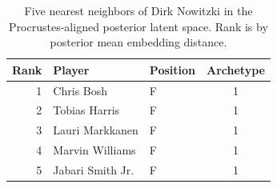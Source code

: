 \begin{table}[htbp]
  \centering\small
  \begin{tabular}{rllc}
    \toprule
    Rank & Player & Position & Archetype \\
    \midrule
    1 & Chris Bosh & F & 1 \\
    2 & Tobias Harris & F & 1 \\
    3 & Lauri Markkanen & F & 1 \\
    4 & Marvin Williams & F & 1 \\
    5 & Jabari Smith Jr. & F & 1 \\
    \bottomrule
  \end{tabular}
  \caption{Five nearest neighbors of Dirk Nowitzki in the Procrustes-aligned posterior latent space. Rank is by posterior mean embedding distance.}
  \label{tab:Dirk_Nowitzki_neighbors}
\end{table}

